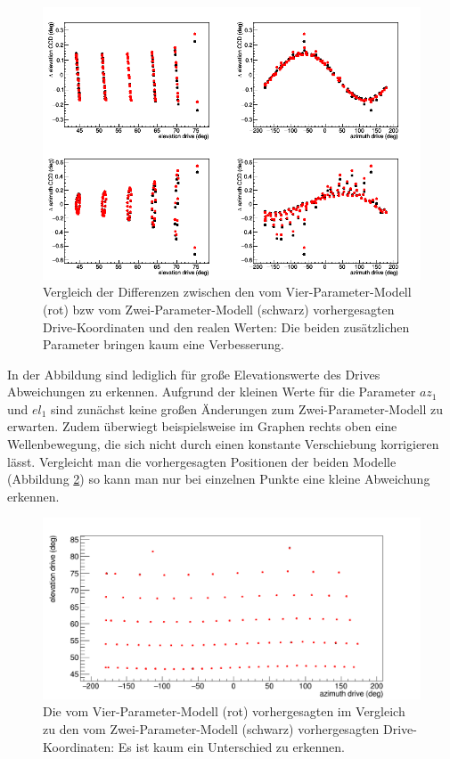 \begin{figure}[htbp]
\centering
\includegraphics[width=\textwidth]{../341/C2D44comp.png}
\caption{Vergleich der Differenzen zwischen den vom Vier-Parameter-Modell (rot) bzw vom Zwei-Parameter-Modell (schwarz) vorhergesagten Drive-Koordinaten und den realen Werten: Die beiden zusätzlichen Parameter bringen kaum eine Verbesserung.}
\label{img:C2D4comp}
\end{figure}
In der Abbildung sind lediglich für große Elevationswerte des Drives Abweichungen zu erkennen. Aufgrund der kleinen Werte für die Parameter $az_1$ und $el_1$ sind zunächst keine großen Änderungen zum Zwei-Parameter-Modell zu erwarten. Zudem überwiegt beispielsweise im Graphen rechts oben eine Wellenbewegung, die sich nicht durch einen konstante Verschiebung korrigieren lässt. Vergleicht man die vorhergesagten Positionen der beiden Modelle (Abbildung \ref{img:C2D4comp2}) so kann man nur bei einzelnen Punkte eine kleine Abweichung erkennen.
\begin{figure}[htbp]
\centering
\includegraphics[width=\textwidth]{../341/C2D44comp2.png}
\caption{Die vom Vier-Parameter-Modell (rot) vorhergesagten im Vergleich zu den vom Zwei-Parameter-Modell (schwarz) vorhergesagten Drive-Koordinaten: Es ist kaum ein Unterschied zu erkennen.}
\label{img:C2D4comp2}
\end{figure}


